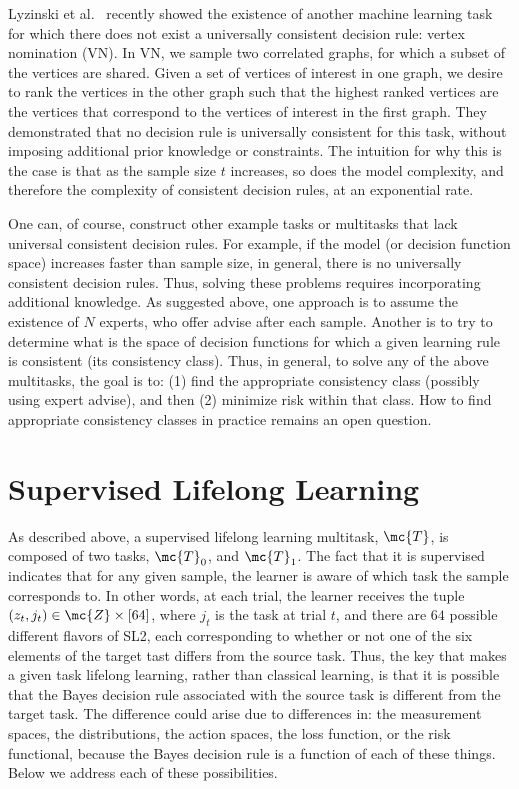 \documentclass{article}
\begin{document}


Lyzinski et al.~\cite{Lyzinski2017-jh} recently showed the existence of another machine learning task for which there does not exist a universally consistent decision rule: vertex nomination (VN).  In VN, we sample two correlated graphs, for which a subset of the vertices are shared.  Given a set of vertices of interest in one graph, we desire to rank the vertices in the other graph such that the highest ranked vertices are the vertices that correspond to the vertices of interest in the first graph.  They demonstrated that no decision rule is universally consistent for this task, without imposing additional prior knowledge or constraints.   The intuition for why this is the case is that as the sample size $t$ increases, so does the model complexity, and therefore the complexity of consistent decision rules, at an exponential rate.


One can, of course, construct other example tasks or multitasks that lack universal consistent decision rules.  For example, if the model (or decision function space) increases faster than sample size, in general, there is no universally consistent decision rules.  Thus, solving these problems requires incorporating additional knowledge.  As suggested above, one approach is to assume the existence of $N$ experts, who offer advise after each sample.  Another is to try to determine what is the space of decision functions for which a given learning rule is consistent (its consistency class). 
Thus, in general, to solve any of the above multitasks, the goal is to: (1) find the appropriate consistency class (possibly using expert advise), and then (2) minimize risk within that class.  How to find appropriate consistency classes  in practice remains an open question.


\section{Supervised Lifelong Learning}
\label{sec:transfer}

As described above,  a supervised lifelong learning multitask, $\mc{T}$, is composed of two tasks, $\mc{T}_0$, and $\mc{T}_1$.  The fact that it is supervised indicates that for any given sample, the learner is aware of which task the sample corresponds to.  In other words, at each trial, the learner receives the tuple $(z_t, j_t) \in \mc{Z} \times [64]$, where $j_t$ is the task at trial $t$, and there are $64$ possible different flavors of SL2, each corresponding to whether or not one of the six elements of the target tast differs from the source task.    
Thus, the key that makes a given task lifelong learning, rather than classical learning, is that it is possible that the Bayes decision rule associated with the source task is different from the target task.  The difference could arise due to differences in: the measurement spaces, the distributions, the action spaces, the loss function, or the risk functional, because the Bayes decision rule is a function of each of these things.  Below we address each of these possibilities.
\end{document}
